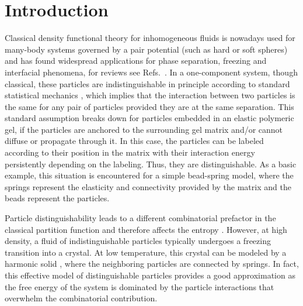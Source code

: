 \documentclass[aps,pre,twocolumn,superscriptaddress,nofootinbib]{revtex4}
\begin{document}
\section{Introduction}
\label{Sec.Introduction}
Classical density functional theory for inhomogeneous fluids is nowadays used for many-body systems governed by a pair potential  (such as hard or soft spheres) and has found widespread applications for phase separation, freezing and interfacial phenomena, for reviews see Refs.~. 
In a one-component system, though classical, these particles are indistinguishable in principle according to standard statistical mechanics \cite{Hansen2006_book}, which implies that the interaction between two particles is the same for any pair of particles provided they are at the same separation. 
This standard assumption breaks down for particles embedded in an elastic polymeric gel, if the particles are anchored to the surrounding gel matrix and/or cannot diffuse or propagate through it. 
In this case, the particles can be labeled according to their position in the matrix with their interaction energy persistently depending on the labeling. 
Thus, they are distinguishable. 
As a basic example, this situation is encountered for a simple bead-spring model, where the springs represent the elasticity and connectivity provided by the matrix and the beads represent the particles. 

Particle distinguishability leads to a different combinatorial prefactor in the classical partition function and therefore affects the entropy \cite{Gibbs1957_book}. 
However, at high density, a fluid of indistinguishable particles typically undergoes a freezing transition into a crystal. 
At low temperature, this crystal can be modeled by a  harmonic solid \cite{Chaikin2000_book,Espanol1996_PhysRevE,Jancovici1967_PhysRevLett}, where the neighboring particles are connected by springs.
In fact, this effective model of distinguishable particles provides a good approximation as the free energy of the system is dominated by the particle interactions that overwhelm the combinatorial contribution.
\end{document}
